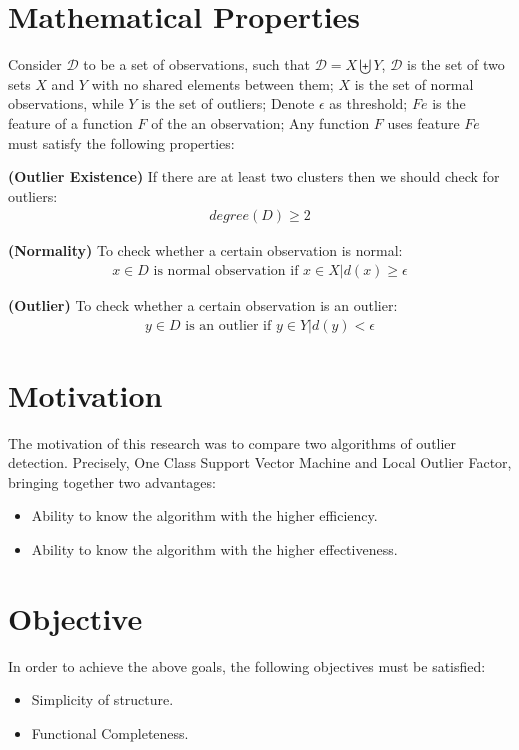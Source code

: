 \section{Mathematical Properties}
Consider $\mathcal{D}$ to be a set of observations, such that $\mathcal{D} = X \biguplus Y$, $\mathcal{D}$ is the set of two sets $X$ and $Y$ with no shared elements between them; $X$ is the set of normal observations, while $Y$ is the set of outliers; Denote $\epsilon$ as threshold; $Fe$ is the feature of a function $F$ of the an observation; Any function $F$ uses feature $Fe$ must satisfy the following properties:

\begin{def}\textbf{(Outlier Existence)} If there are at least two clusters then we should check for outliers:
\begin{align}
degree(D) \geq 2
\end{align}
\end{def}

\begin{def}\textbf{(Normality)} To check whether a certain observation is normal:
\begin{align}
x \in D \text{ is normal observation if } x \in X | d(x) \geq \epsilon
\end{align}
\end{def}

\begin{def}\textbf{(Outlier)} To check whether a certain observation is an outlier:
\begin{align}
y \in D \text{ is an outlier if } y \in Y | d(y) < \epsilon
\end{align}
\end{def}

\section{Motivation}
The motivation of this research was to compare two algorithms of outlier detection. Precisely, One Class Support Vector Machine and Local Outlier Factor, bringing together two advantages:
\begin{itemize}
\item Ability to know the algorithm with the higher efficiency.
\item Ability to know the algorithm with the higher effectiveness.
\end{itemize}

\section{Objective}
In order to achieve the above goals, the following objectives must be satisfied:
\begin{itemize}
\item Simplicity of structure.
\item Functional Completeness.
\end{itemize}

